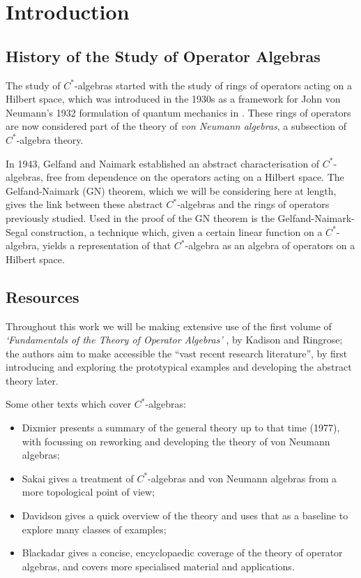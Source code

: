 \documentclass[11pt,a4paper]{report}
\theoremstyle{plain}
\theoremstyle{definition}
\newcommand{\1}{\mathbbm{1}}
\begin{document}
\chapter{Introduction}
\section{History of the Study of Operator Algebras}
The study of $C^\ast$-algebras started with the study of rings of operators 
acting on a Hilbert space, which was introduced in the 1930s as a framework for 
John von Neumann's 1932 formulation of quantum mechanics in \cite{vonneumann32}. 
These rings of operators are now considered part of the theory of \emph{von 
Neumann algebras}, a subsection of $C^\ast$-algebra theory. 



{In 1943, Gelfand and Naimark \cite{gelfand43} established an abstract 
characterisation of $C^\ast$-algebras, free from dependence on the operators 
acting on a Hilbert space. The Gelfand-Naimark (GN) theorem, which we will be 
considering here at length, gives the link between these abstract 
$C^\ast$-algebras and the rings of operators previously studied. Used in the 
proof of the GN theorem is the Gelfand-Naimark-Segal construction, a technique 
which, given a certain linear function on a $C^\ast$-algebra, yields a 
representation of that $C^\ast$-algebra as an algebra of operators on a Hilbert 
space.} 

\section{Resources}
Throughout this work we will be making extensive use of the first volume of 
\emph{`Fundamentals of the Theory of Operator Algebras'} 
\cite{kadison83,kadison86}, by Kadison and Ringrose; the authors aim to make 
accessible the ``vast recent research literature'', by first introducing and 
exploring the prototypical examples and developing the abstract theory later. 

	
Some other texts which cover $C^\ast$-algebras: 
\begin{itemize}
	\item 	Dixmier \cite{dixmier77} presents a summary of the general theory up to 
	that time (1977), with \cite{dixmier81} focussing on reworking and developing 
	the theory of von Neumann algebras; 
	\item 	Sakai \cite{sakai71} gives a treatment of $C^\ast$-algebras and von 
	Neumann algebras from a more topological point of view; 
	\item	Davidson \cite{davidson96} gives a quick overview of the theory and uses 
	that as a baseline to explore many classes of examples;
	\item 	Blackadar \cite{blackadar06} gives a concise, encyclopaedic coverage of 
	the theory of operator algebras, and covers more specialised material and 
	applications. 

\end{itemize}
	
\end{document}
